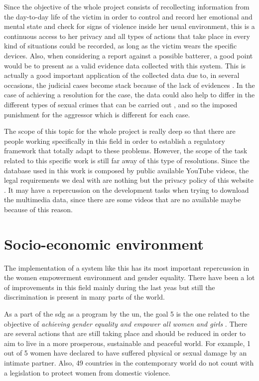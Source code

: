 	Since the objective of the whole project consists of recollecting information from the day-to-day life of the victim in order to control and record her emotional and mental state and check for signs of violence inside her usual environment, this is a continuous access to her privacy and all types of actions that take place in every kind of situations could be recorded, as long as the victim wears the specific devices. Also, when considering a report against a possible batterer, a good point would be to present as a valid evidence data collected with this system. This is actually a good important application of the collected data due to, in several occasions, the judicial cases become stack because of the lack of evidences \cite{UC3M4SafetyTeam2018}. In the case of achieving a resolution for the case, the data could also help to differ in the different types of sexual crimes that can be carried out \cite{Baldwin}, and so the imposed punishment for the aggressor which is different for each case.
	
	The scope of this topic for the whole project is really deep so that there are people working specifically in this field in order to establish a regulatory framework that totally adapt to these problems. However, the scope of the task related to this specific work is still far away of this type of resolutions. Since the database used in this work is composed by public available YouTube videos, the legal requirements we deal with are nothing but the privacy policy of this website \cite{Goetzparterns}. It may have a repercussion on the development tasks when trying to download the multimedia data, since there are some videos that are no available maybe because of this reason. 

\section{Socio-economic environment}
	
	The implementation of a system like this has its most important repercussion in the women empowerment environment and gender equality. There have been a lot of improvements in this field mainly during the last yeas but still the discrimination is present in many parts of the world. 
	
	As a part of the \acrfull{sdg} as a program by the \acrfull{un}, the goal 5 is the one related to the objective of \textit{achieving gender equality and empower all women and girls} \cite{UnitedNations}. There are several actions that are still taking place and should be reduced in order to aim to live in a more prosperous, sustainable and peaceful world. For example, 1 out of 5 women have declared to have suffered physical or sexual damage by an intimate partner. Also, 49 countries in the contemporary world do not count with a legislation to protect women from domestic violence. 
	

